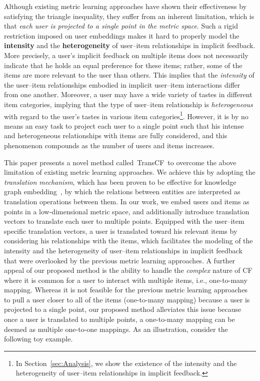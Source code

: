 \documentclass[conference]{IEEEtran}
\newcommand{\propose}{\textsf{{TransCF}}}
\begin{document}
Although existing metric learning approaches have shown their effectiveness by satisfying the triangle inequality, they suffer from an inherent limitation, which is that \textit{each user is projected to a single point in the metric space}. Such a rigid restriction imposed on user embeddings makes it hard to properly model the {\textbf{intensity}} and the {\textbf{heterogeneity}} of user--item relationships in implicit feedback.
More precisely, a user's implicit feedback  on multiple items does not necessarily indicate that he holds an equal preference for these items; rather, some of the items are more relevant to the user than others. 
This implies that the \textit{intensity} of the user--item relationships embodied in implicit user--item interactions differ from one another.
Moreover, a user may have a wide variety of tastes in different item categories, implying that 
the type of user--item relationship is \textit{heterogeneous} with regard to the user's tastes in various item categories\footnote{In Section~\ref{sec:Analysis}, we show the existence of the intensity and the heterogeneity of user--item relationships in implicit feedback.}.
However, it is by no means an easy task to project each user to a single point such that his intense and heterogeneous relationships with items are fully considered,
and this phenomenon compounds as the number of users and items increases.










This paper presents a novel method called~\propose~to overcome the above limitation of existing metric learning approaches.
We achieve this by adopting the \textit{translation mechanism}, which has been proven to be effective for knowledge graph embedding~\cite{bordes2013translating,lin2015learning}, by which the relations between entities are interpreted as translation operations between them. 
In our work, we embed users and items as points in a low-dimensional metric space, and additionally introduce translation vectors to translate each user to multiple points.
Equipped with the user--item specific translation vectors, a user is translated toward his relevant items by considering his relationships with the items,
\vspace{-0.01ex}
which facilitates the modeling of the intensity and the heterogeneity of user--item relationships in implicit feedback that were overlooked by the previous metric learning approaches.
A further appeal of our proposed method is the ability to handle the \textit{complex} nature of CF where it is common for a user to interact with multiple items, i.e., one-to-many mapping.
Whereas it is not feasible for the previous metric learning approaches to pull a user closer to all of the items (one-to-many mapping) because a user is projected to a single point, our proposed method alleviates this issue
because once a user is translated to multiple points, 
a one-to-many mapping can be deemed as multiple one-to-one mappings. 
As an illustration, consider the following toy example.
\end{document}
